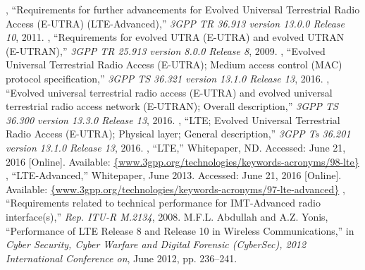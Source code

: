 %

\begin{thebibliography}{99.}%
	, ``{Requirements for further advancements for Evolved Universal Terrestrial Radio Access (E-UTRA) (LTE-Advanced)},'' \emph{{3GPP TR 36.913 version 13.0.0 Release 10}}, 2011.
	, ``{Requirements for evolved UTRA (E-UTRA) and evolved UTRAN (E-UTRAN)},'' \emph{{3GPP TR 25.913 version 8.0.0 Release 8}}, 2009.
	, ``{Evolved Universal Terrestrial Radio Access (E-UTRA); Medium access control (MAC) protocol specification},'' \emph{{3GPP TS 36.321 version 13.1.0 Release 13}}, 2016.
	, ``{Evolved universal terrestrial radio access (E-UTRA) and evolved universal terrestrial radio access network (E-UTRAN); Overall description},'' \emph{{3GPP TS 36.300 version 13.3.0 Release 13}}, 2016.
	, ``LTE; Evolved Universal Terrestrial Radio Access (E-UTRA); Physical layer; General description,'' \emph{{3GPP Ts 36.201 version 13.1.0 Release 13}}, 2016.
	, ``{LTE},'' Whitepaper, ND. Accessed: June 21, 2016 [Online]. Available: \url{{www.3gpp.org/technologies/keywords-acronyms/98-lte}}
	, ``{LTE-Advanced},'' Whitepaper, June 2013. Accessed: June 21, 2016 [Online]. Available: \url{{www.3gpp.org/technologies/keywords-acronyms/97-lte-advanced}} 
	, ``Requirements related to technical performance for IMT-Advanced radio interface(s),'' \emph{Rep. ITU-R M.2134}, 2008. 
	 {M.F.L. Abdullah and A.Z. Yonis}, ``{Performance of LTE Release 8 and Release 10 in Wireless Communications},'' in \emph{{Cyber Security, Cyber Warfare and Digital Forensic (CyberSec), 2012 International Conference on}}, June 2012, pp. 236--241.
		
\end{thebibliography}